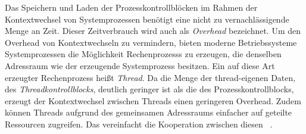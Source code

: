 Das Speichern und Laden der Prozesskontrollblöcken im Rahmen der Kontextwechsel von Systemprozessen benötigt eine nicht zu vernachlässigende Menge an Zeit. Dieser Zeitverbrauch wird auch als \emph{Overhead} bezeichnet. Um den Overhead von Kontextwechseln zu vermindern, bieten moderne Betriebssysteme Systemprozessen die Möglichkeit \glspl{Rechenprozess} zu erzeugen, die denselben Adressraum wie der erzeugende Systemprozess besitzen. Ein auf diese Art erzeugter \gls{Rechenprozess} heißt \emph{Thread}. Da die Menge der thread-eigenen Daten, des \emph{Threadkontrollblocks}, deutlich geringer ist als die des Prozesskontrollblocks, erzeugt der Kontextwechsel zwischen Threads einen geringeren Overhead. Zudem können Threads aufgrund des gemeinsamen Adressraums einfacher auf geteilte Ressourcen zugreifen. Das vereinfacht die Kooperation zwischen diesen ~\cite[S.~139~\psqq]{Tanenbaum2016}.

